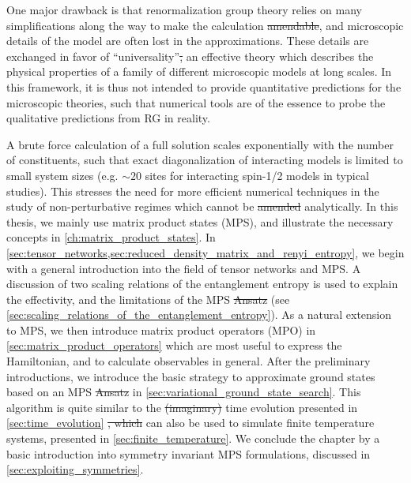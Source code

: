 \documentclass{svmono}
\providecommand{\DIFaddtex}[1]{{\protect\color{blue}\uwave{#1}}} %
\providecommand{\DIFdeltex}[1]{{\protect\color{red}\sout{#1}}}                      %
\providecommand{\DIFaddbegin}{} %
\providecommand{\DIFaddend}{} %
\providecommand{\DIFdelbegin}{} %
\providecommand{\DIFdelend}{} %
\providecommand{\DIFadd}[1]{\texorpdfstring{\DIFaddtex{#1}}{#1}} %
\providecommand{\DIFdel}[1]{\texorpdfstring{\DIFdeltex{#1}}{}} %
\newcommand{\DIFscaledelfig}{0.5}
\newlength{\DIFdelgraphicswidth} %
\newlength{\DIFdelgraphicsheight} %
\newcommand{\DIFaddincludegraphics}[2][]{{\color{blue}\fbox{\DIFOincludegraphics[#1]{#2}}}} %
\newcommand{\DIFdelincludegraphics}[2][]{%
\sbox{\DIFdelgraphicsbox}{\DIFOincludegraphics[#1]{#2}}%
\settoboxwidth{\DIFdelgraphicswidth}{\DIFdelgraphicsbox} %
\settoboxtotalheight{\DIFdelgraphicsheight}{\DIFdelgraphicsbox} %
\scalebox{\DIFscaledelfig}{%
\parbox[b]{\DIFdelgraphicswidth}{\usebox{\DIFdelgraphicsbox}\\[-\baselineskip] \rule{\DIFdelgraphicswidth}{0em}}\llap{\resizebox{\DIFdelgraphicswidth}{\DIFdelgraphicsheight}{%
\setlength{\unitlength}{\DIFdelgraphicswidth}%
\begin{picture}(1,1)%
\thicklines\linethickness{2pt} %
{\color[rgb]{1,0,0}\put(0,0){\framebox(1,1){}}}%
{\color[rgb]{1,0,0}\put(0,0){\line( 1,1){1}}}%
{\color[rgb]{1,0,0}\put(0,1){\line(1,-1){1}}}%
\end{picture}%
}\hspace*{3pt}}} %
} %
\DeclareRobustCommand{\DIFaddbegin}{\DIFOaddbegin \let\includegraphics\DIFaddincludegraphics} %
\DeclareRobustCommand{\DIFaddend}{\DIFOaddend \let\includegraphics\DIFOincludegraphics} %
\DeclareRobustCommand{\DIFdelbegin}{\DIFOdelbegin \let\includegraphics\DIFdelincludegraphics} %
\DeclareRobustCommand{\DIFdelend}{\DIFOaddend \let\includegraphics\DIFOincludegraphics} %
\begin{document}
One major drawback is that renormalization group theory relies on many simplifications along the way to make the calculation \DIFdelbegin \DIFdel{amendable}\DIFdelend \DIFaddbegin \DIFadd{amenable}\DIFaddend , and microscopic details of the model are often lost in the approximations.
These details are exchanged in favor of ``universality''\DIFdelbegin \DIFdel{, }\DIFdelend \DIFaddbegin \DIFadd{: }\DIFaddend an effective theory which describes the physical properties of a family of different microscopic models at long scales.
In this framework, it is thus not intended to provide quantitative predictions for the microscopic theories, such that numerical tools are of the essence to probe the qualitative predictions from RG in reality.

A brute force calculation of a full solution scales exponentially with the number of constituents, such that exact diagonalization of interacting models is limited to small system sizes (e.g. \DIFdelbegin \DIFdel{$\sim 20$ }\DIFdelend \DIFaddbegin \DIFadd{$\sim 30$ }\DIFaddend sites for interacting spin-1/2 models in typical studies).
This stresses the need for more efficient numerical techniques in the study of non-perturbative regimes which cannot be \DIFdelbegin \DIFdel{amended }\DIFdelend \DIFaddbegin \DIFadd{tackled }\DIFaddend analytically.
In this thesis, we mainly use matrix product states (MPS), and illustrate the necessary concepts in \cref{ch:matrix_product_states}.
In \cref{sec:tensor_networks,sec:reduced_density_matrix_and_renyi_entropy}, we begin with a general introduction into the field of tensor networks and MPS.
A discussion of two scaling relations of the entanglement entropy is used to explain the effectivity, and the limitations of the MPS \DIFdelbegin \DIFdel{Ansatz }\DIFdelend \DIFaddbegin \DIFadd{ansatz }\DIFaddend (see \cref{sec:scaling_relations_of_the_entanglement_entropy}).
As a natural extension to MPS, we then introduce matrix product operators (MPO) in \cref{sec:matrix_product_operators} which are most useful to express the Hamiltonian, and to calculate observables in general.
After the preliminary introductions, we introduce the basic strategy to approximate ground states based on an MPS \DIFdelbegin \DIFdel{Ansatz }\DIFdelend \DIFaddbegin \DIFadd{ansatz }\DIFaddend in \cref{sec:variational_ground_state_search}.
This algorithm is quite similar to the \DIFdelbegin \DIFdel{(imaginary) }\DIFdelend time evolution presented in \cref{sec:time_evolution} \DIFdelbegin \DIFdel{, which }\DIFdelend \DIFaddbegin \DIFadd{and it }\DIFaddend can also be used to simulate finite temperature systems, presented in \cref{sec:finite_temperature}.
We conclude the chapter by a basic introduction into symmetry invariant MPS formulations, discussed in \cref{sec:exploiting_symmetries}.
\end{document}
